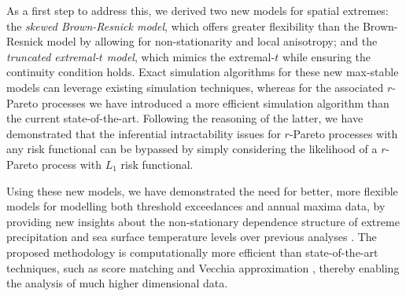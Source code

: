 \documentclass[12pt]{article}
\begin{document}
As a first step to address this,
we derived two new models for spatial extremes: the \emph{skewed Brown-Resnick model}, which offers greater flexibility than the Brown-Resnick model by allowing for non-stationarity and local anisotropy; and the \emph{truncated extremal-$t$ model}, which mimics the extremal-$t$ while ensuring the 
continuity 
condition holds. 
Exact simulation algorithms for these new max-stable models 
can 
leverage existing simulation techniques, whereas for the associated $r$-Pareto processes we have introduced a more efficient simulation algorithm than the current state-of-the-art. 
%
Following the reasoning of the latter, we have demonstrated that the inferential intractability issues for $r$-Pareto processes with any risk functional can be bypassed by simply considering the likelihood of a $r$-Pareto process with $L_1$ risk functional.


Using these new models, we have demonstrated
the need for better, more flexible models for
modelling both threshold exceedances and annual maxima data, 
by providing new insights about the non-stationary dependence structure of extreme precipitation and sea surface temperature levels over previous analyses \citep{deFondeville.Davison:2018,Huser.Zhong:2023}. 
The proposed methodology is 
computationally more efficient than state-of-the-art techniques, such as score matching \citep{deFondeville.Davison:2018} and Vecchia approximation \citep{Huser.Zhong:2023}, 
thereby enabling the analysis of much higher dimensional data. 


\end{document}
